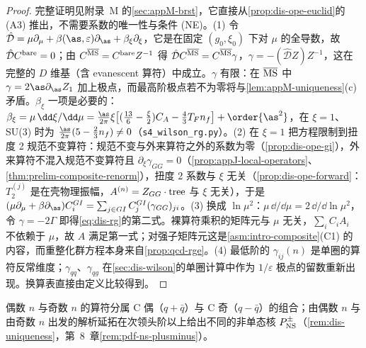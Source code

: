 \begin{proof}
完整证明见附录~M 的\cref{sec:appM-brst}，它直接从\cref{prop:dis-ope-euclid}的 (A3) 推出，不需要系数的唯一性与条件 (NE)。(1) 令 $\hat{\mathcal D}=\mu\partial_\mu+\beta(\as,\varepsilon)\partial_{\as}+\beta_\xi\partial_\xi$，它是在固定 $(g_0,\xi_0)$ 下对 $\mu$ 的全导数，故 $\hat{\mathcal D}C^{\rm bare}=0$；由 $C^{\overline{\rm MS}}=C^{\rm bare}Z^{-1}$ 得 $\hat{\mathcal D}C^{\overline{\rm MS}}=C^{\overline{\rm MS}}\gamma$，$\gamma=-(\hat{\mathcal D}Z)Z^{-1}$，这在完整的 $D$ 维基（含 evanescent 算符）中成立。$\gamma$ 有限：在 $\overline{\rm MS}$ 中 $\gamma=2\as\partial_{\as}Z_1$ 加上极点，而最高阶极点若不为零将与\cref{lem:appM-uniqueness}(c) 矛盾。$\beta_\xi$ 一项是必要的：$\beta_\xi=\mu\,\dd\xi/\dd\mu=\frac{\as}{2\pi}\xi\big[(\frac{13}6-\frac\xi2)C_A-\frac43T_Fn_f\big]+\order{\as^2}$，在 $\xi=1$、SU(3) 时为 $\frac{\as}{2\pi}(5-\frac23n_f)\ne0$（\texttt{s4\_wilson\_rg.py}）。(2) 在 $\xi=1$ 把方程限制到扭度 2 规范不变算符：规范不变与外来算符之外的系数为零（\cref{prop:dis-ope-gi}），外来算符不混入规范不变算符且 $\partial_\xi\gamma_{GG}=0$（\cref{prop:appJ-local-operators}、\cref{thm:prelim-composite-renorm}），扭度 2 系数与 $\xi$ 无关（\cref{prop:dis-ope-forward}：$T^{(j)}_2$ 是在壳物理振幅，$A^{(n)}=Z_{GG}\cdot{\rm tree}$ 与 $\xi$ 无关），于是 $(\mu\partial_\mu+\beta\partial_{\as})C^{GI}_i=\sum_{j\in GI}C^{GI}_j(\gamma_{GG})_{ji}$。(3) 换成 $\ln\mu^2$：$\mu\,\dd/\dd\mu=2\,\dd/\dd\ln\mu^2$，令 $\gamma=-2\Gamma$ 即得\cref{eq:dis-rg}的第二式。裸算符乘积的矩阵元与 $\mu$ 无关，$\sum_iC_iA_i$ 不依赖于 $\mu$，故 $A$ 满足第一式；对强子矩阵元这是\cref{asm:intro-composite}(C1) 的内容，而重整化群方程本身来自\cref{prop:qcd-rge}。(4) 最低阶的 $\gamma_{ij}(n)$ 是单圈的算符反常维度；$\gamma_{qq}$、$\gamma_{qg}$ 在\cref{sec:dis-wilson}的单圈计算中作为 $1/\varepsilon$ 极点的留数重新出现。换算表直接由定义比较得到。
\end{proof}

偶数 $n$ 与奇数 $n$ 的算符分属 C 偶（$q+\bar q$）与 C 奇（$q-\bar q$）的组合；由偶数 $n$ 与由奇数 $n$ 出发的解析延拓在次领头阶以上给出不同的非单态核 $P^\pm_{\rm NS}$（\cref{rem:dis-uniqueness}，第~8~章\cref{rem:pdf-ns-plusminus}）。
